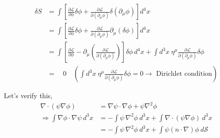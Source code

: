 \documentclass[14pt]{article} %
\begin{document}
\begin{align*}
\delta S &= \int \left[ \frac{\partial \mathcal{L}}{\partial \phi} \delta \phi + \frac{\partial \mathcal{L}}{\partial(\partial_\mu \phi)} \delta(\partial_\mu \phi) \right] d^4x \\
&= \int \left[ \frac{\partial \mathcal{L}}{\partial \phi} \delta \phi + \frac{\partial \mathcal{L}}{\partial(\partial_\mu \phi)} \partial_\mu(\delta \phi) \right] d^4x \\
&= \int \left[ \frac{\partial \mathcal{L}}{\partial \phi} - \partial_\mu \left( \frac{\partial \mathcal{L}}{\partial(\partial_\mu \phi)} \right) \right] \delta \phi \, d^4x 
+ \int d^3x~\eta^\mu \frac{\partial \mathcal{L}}{\partial(\partial_\mu \phi)} \delta \phi \\
&= \quad0 \quad\left( \int d^3x~\eta^\mu \frac{\partial \mathcal{L}}{\partial(\partial_\mu \phi)} \delta \phi = 0 \to \text{ Dirichlet condition} \right)
\end{align*}
\begin{tcolorbox}[ title=Verifying Dirichlet condition]
Let's verify this,
\begin{align*}
\nabla \cdot (\psi \nabla \phi) &= \nabla \psi \cdot \nabla \phi + \psi \nabla^2 \phi \\
\Rightarrow \int \nabla \phi \cdot \nabla \psi~d^3x &= -\int \psi \, \nabla^2 \phi~d^3 x +\int\nabla \cdot(\psi \nabla \phi)~ d^3 x \\
&=  -\int \psi \, \nabla^2 \phi~d^3 x +\int \psi (n\cdot\nabla) \phi~ d \mathcal{S}
\end{align*}
\end{tcolorbox}
\end{document}
